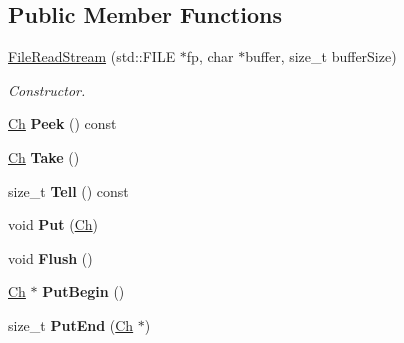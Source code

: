 \subsection*{Public Member Functions}
\begin{DoxyCompactItemize}
\item 
\hyperlink{class_file_read_stream_adf91191843d50b900f43cb4f35f16f67}{File\+Read\+Stream} (std\+::\+F\+I\+LE $\ast$fp, char $\ast$buffer, size\+\_\+t buffer\+Size)
\begin{DoxyCompactList}\small\item\em Constructor. \end{DoxyCompactList}\item 
\hyperlink{class_file_read_stream_ae1f83d9ca3c76d1d151af0b6c427f046}{Ch} {\bfseries Peek} () const \hypertarget{class_file_read_stream_ab129c5d15343488caf60b4fee48024fb}{}\label{class_file_read_stream_ab129c5d15343488caf60b4fee48024fb}

\item 
\hyperlink{class_file_read_stream_ae1f83d9ca3c76d1d151af0b6c427f046}{Ch} {\bfseries Take} ()\hypertarget{class_file_read_stream_addcbccc9d86ccbbe6d8e876ba595dbcb}{}\label{class_file_read_stream_addcbccc9d86ccbbe6d8e876ba595dbcb}

\item 
size\+\_\+t {\bfseries Tell} () const \hypertarget{class_file_read_stream_a9a2f09eb66ae912c4d5f472bdfdd92ce}{}\label{class_file_read_stream_a9a2f09eb66ae912c4d5f472bdfdd92ce}

\item 
void {\bfseries Put} (\hyperlink{class_file_read_stream_ae1f83d9ca3c76d1d151af0b6c427f046}{Ch})\hypertarget{class_file_read_stream_a4f2eac5b08033b1527bff517be657a36}{}\label{class_file_read_stream_a4f2eac5b08033b1527bff517be657a36}

\item 
void {\bfseries Flush} ()\hypertarget{class_file_read_stream_acd031e3f578b23bc2a792ac41e1e95ae}{}\label{class_file_read_stream_acd031e3f578b23bc2a792ac41e1e95ae}

\item 
\hyperlink{class_file_read_stream_ae1f83d9ca3c76d1d151af0b6c427f046}{Ch} $\ast$ {\bfseries Put\+Begin} ()\hypertarget{class_file_read_stream_ac985850ab75f204dc08a01d12a8ef5c6}{}\label{class_file_read_stream_ac985850ab75f204dc08a01d12a8ef5c6}

\item 
size\+\_\+t {\bfseries Put\+End} (\hyperlink{class_file_read_stream_ae1f83d9ca3c76d1d151af0b6c427f046}{Ch} $\ast$)\hypertarget{class_file_read_stream_a886660c89f698ff913d641d61466108f}{}\label{class_file_read_stream_a886660c89f698ff913d641d61466108f}


\end{DoxyCompactItemize}
